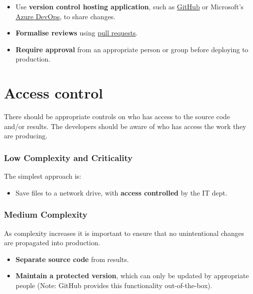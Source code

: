 \documentclass[]{book}
\providecommand{\tightlist}{%
  \setlength{\itemsep}{0pt}\setlength{\parskip}{0pt}}
\begin{document}
\begin{itemize}
\tightlist
\item
  Use \textbf{version control hosting application}, such as \href{https://help.github.com/}{GitHub} or
  Microsoft's \href{https://azure.microsoft.com/en-us/product-categories/devops/}{Azure DevOps}, to
  share changes.
\item
  \textbf{Formalise reviews} using
  \href{https://help.github.com/articles/about-pull-requests/}{pull requests}.
\item
  \textbf{Require approval} from an appropriate person or group before deploying to production.
\end{itemize}

\hypertarget{access-control}{%
\section{Access control}\label{access-control}}

There should be appropriate controls on who has access to the source code and/or results.
The developers should be aware of who has access the work they are producing.

\hypertarget{low-complexity-and-criticality-4}{%
\subsubsection{Low Complexity and Criticality}\label{low-complexity-and-criticality-4}}

The simplest approach is:

\begin{itemize}
\tightlist
\item
  Save files to a network drive, with \textbf{access controlled} by the IT dept.
\end{itemize}

\hypertarget{medium-complexity-4}{%
\subsubsection{Medium Complexity}\label{medium-complexity-4}}

As complexity increases it is important to ensure that no unintentional changes are propagated
into production.

\begin{itemize}
\tightlist
\item
  \textbf{Separate source code} from results.
\item
  \textbf{Maintain a protected version}, which can only be updated by appropriate people
  (Note: GitHub provides this functionality out-of-the-box).
\end{itemize}
\end{document}
